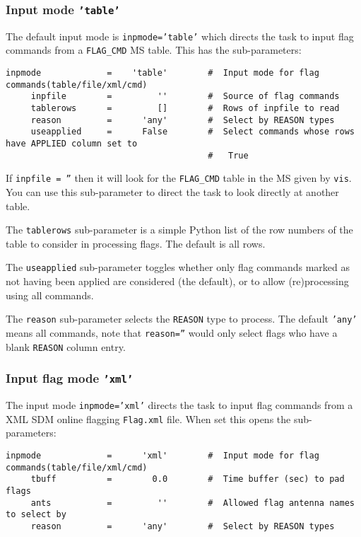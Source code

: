 \subsubsection{Input mode {\tt 'table'}}
\label{section:edit.flagcmd.inpmode.table}

The default input mode is {\tt inpmode='table'} which directs the
task to input flag commands from a {\tt FLAG\_CMD} MS table.  
This has the sub-parameters:
\small
\begin{verbatim}
inpmode             =    'table'        #  Input mode for flag commands(table/file/xml/cmd)
     inpfile        =         ''        #  Source of flag commands
     tablerows      =         []        #  Rows of inpfile to read
     reason         =      'any'        #  Select by REASON types
     useapplied     =      False        #  Select commands whose rows have APPLIED column set to
                                        #   True
\end{verbatim}
\normalsize

If {\tt inpfile = ''} then it will look for the {\tt FLAG\_CMD} 
table in the MS given by {\tt vis}. You can use this sub-parameter to
direct the task to look directly at another table.

The {\tt tablerows} sub-parameter is a simple Python list of the row
numbers of the table to consider in processing flags.  The default is
all rows.

The {\tt useapplied} sub-parameter toggles whether only flag commands
marked as not having been applied are considered (the default), or
to allow (re)processing using all commands.

The {\tt reason} sub-parameter selects the {\tt REASON} type to
process.  The default {\tt 'any'} means all commands, note that
{\tt reason=''} would only select flags who have a blank {\tt REASON}
column entry.

\subsubsection{Input flag mode {\tt 'xml'}}
\label{section:edit.flagcmd.inpmode.xml}

The input mode {\tt inpmode='xml'} directs the
task to input flag commands from a XML SDM online flagging 
{\tt Flag.xml} file.  
When set this opens the sub-parameters:
\small
\begin{verbatim}
inpmode             =      'xml'        #  Input mode for flag commands(table/file/xml/cmd)
     tbuff          =        0.0        #  Time buffer (sec) to pad flags
     ants           =         ''        #  Allowed flag antenna names to select by
     reason         =      'any'        #  Select by REASON types
\end{verbatim}
\normalsize

